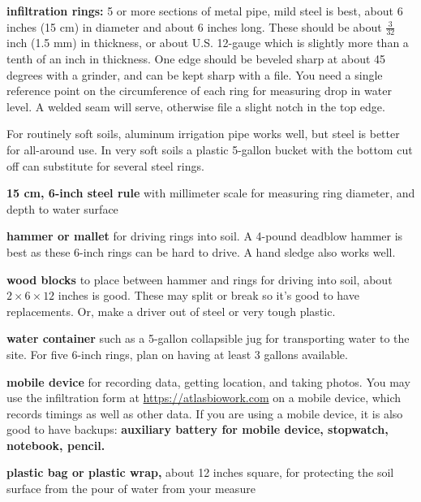 \documentclass[11pt,letterpaper,twoside,onecolumn]{memoir}
\begin{document}
\begin{checkboxlist}
\item {\textbf{infiltration rings:} 5 or more sections of metal pipe, mild steel is best, about 6 inches (15 cm) in diameter and about 6 inches long. These should be about $\frac{3}{32}$ inch (1.5 mm) in thickness, or about U.S. 12-gauge which is slightly more than a tenth of an inch in thickness. One edge should be beveled sharp at about 45 degrees with a grinder, and can be kept sharp with a file. You need a single reference point on the circumference of each ring for measuring drop in water level. A welded seam will serve, otherwise file a slight notch in the top edge.

For routinely soft soils, aluminum irrigation pipe works well, but steel is better for all-around use. In very soft soils a plastic 5-gallon bucket with the bottom cut off can substitute for several steel rings.
}

\item \textbf{15 cm, 6-inch steel rule} with millimeter scale for measuring ring diameter, and depth to water surface

\item \textbf{hammer or mallet} for driving rings into soil. A 4-pound deadblow hammer is best as these 6-inch rings can be hard to drive. A hand sledge also works well.

\item \textbf{wood blocks} to place between hammer and rings for driving into soil, about $2 \times 6 \times 12$ inches is good. These may split or break so it's good to have replacements. Or, make a driver out of steel or very tough plastic.

\item \textbf{water container} such as a 5-gallon collapsible jug for transporting water to the site. For five 6-inch rings, plan on having at least 3 gallons available.

\item \textbf{mobile device} for recording data, getting location, and taking photos. You may use the infiltration form at \url{https://atlasbiowork.com} on a mobile device, which records timings as well as other data. If you are using a mobile device, it is also good to have backups: \textbf{auxiliary battery for mobile device, stopwatch, notebook, pencil.}

\item \textbf{plastic bag or plastic wrap,} about 12 inches square, for protecting the soil surface from the pour of water from your measure


\end{checkboxlist}
\end{document}
